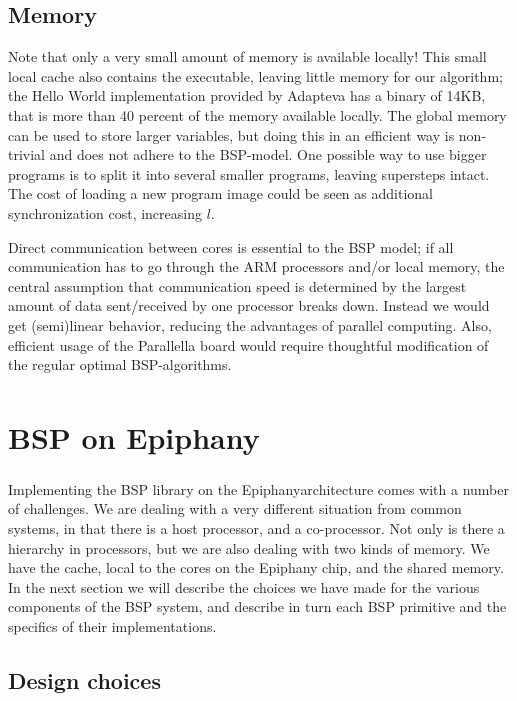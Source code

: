 \documentclass[fleqn]{article}
\renewcommand{\(}{\left(}
\renewcommand{\)}{\right)}
\newcommand{\tm}{\textsuperscript{\texttrademark}}
\begin{document}
\subsection{Memory}
Note that only a very small amount of memory is available locally! This small local cache also contains the executable, leaving little memory for our algorithm; the Hello World implementation provided by Adapteva has a binary of 14KB, that is more than 40 percent of the memory available locally. The global memory can be used to store larger variables, but doing this in an efficient way is non-trivial and does not adhere to the BSP-model. One possible way to use bigger programs is to split it into several smaller programs, leaving supersteps intact. The cost of loading a new program image could be seen as additional synchronization cost, increasing $l$.

Direct communication between cores is essential to the BSP model; if all communication has to go through the ARM processors and/or local memory, the central assumption that communication speed is determined by the largest amount of data sent/received by one processor breaks down. Instead we would get (semi)linear behavior, reducing the advantages of parallel computing. Also, efficient usage of the Parallella board would require thoughtful modification of the regular optimal BSP-algorithms. 


\section{BSP on Epiphany\tm}

Implementing the BSP library on the Epiphany\tm architecture comes with a number of challenges. We are dealing with a very different situation from common systems, in that there is a host processor, and a co-processor. Not only is there a hierarchy in processors, but we are also dealing with two kinds of memory. We have the cache, local to the cores on the Epiphany chip, and the shared memory. In the next section we will describe the choices we have made for the various components of the BSP system, and describe in turn each BSP primitive and the specifics of their implementations.

\subsection{Design choices}
\end{document}
